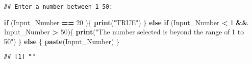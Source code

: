 \documentclass[
]{article}
\newenvironment{Shaded}{\begin{snugshade}}{\end{snugshade}}
\newcommand{\ControlFlowTok}[1]{\textcolor[rgb]{0.13,0.29,0.53}{\textbf{#1}}}
\newcommand{\DecValTok}[1]{\textcolor[rgb]{0.00,0.00,0.81}{#1}}
\newcommand{\FunctionTok}[1]{\textcolor[rgb]{0.13,0.29,0.53}{\textbf{#1}}}
\newcommand{\NormalTok}[1]{#1}
\newcommand{\SpecialCharTok}[1]{\textcolor[rgb]{0.81,0.36,0.00}{\textbf{#1}}}
\newcommand{\StringTok}[1]{\textcolor[rgb]{0.31,0.60,0.02}{#1}}
\begin{document}
\begin{verbatim}
## Enter a number between 1-50:
\end{verbatim}

\begin{Shaded}
\begin{Highlighting}[]
\ControlFlowTok{if}\NormalTok{ (Input\_Number }\SpecialCharTok{==} \DecValTok{20}\NormalTok{ )\{}
  \FunctionTok{print}\NormalTok{(}\StringTok{"TRUE"}\NormalTok{)}
\NormalTok{\} }\ControlFlowTok{else} \ControlFlowTok{if}\NormalTok{ (Input\_Number }\SpecialCharTok{\textless{}} \DecValTok{1} \SpecialCharTok{\&\&}\NormalTok{ Input\_Number }\SpecialCharTok{\textgreater{}} \DecValTok{50}\NormalTok{)\{}
  \FunctionTok{print}\NormalTok{(}\StringTok{"The number selected is beyond the range of 1 to 50"}\NormalTok{)}
\NormalTok{\} }\ControlFlowTok{else}\NormalTok{ \{}
  \FunctionTok{paste}\NormalTok{(Input\_Number)}
\NormalTok{\}}
\end{Highlighting}
\end{Shaded}

\begin{verbatim}
## [1] ""
\end{verbatim}
\end{document}
